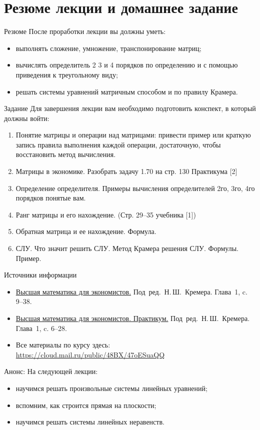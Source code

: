 \documentclass[unicode,11pt,notheorems]{beamer}
\begin{document}
\section{Резюме лекции и домашнее задание}
\begin{frame}{Резюме}
	После проработки лекции вы должны уметь:
	\begin{itemize}
	\item 
		выполнять сложение, умножение, транспонирование матриц;
	\item 
		вычислять определитель 2 3 и 4 порядков по определению и с помощью приведения к треугольному виду;
	\item 
		решать системы уравнений матричным способом и по правилу Крамера.
	\end{itemize}		
\end{frame}


\begin{frame}{Задание}
Для завершения лекции вам необходимо подготовить конспект, в который должны войти:
	\begin{enumerate}
		\item 
			Понятие матрицы и операции над матрицами: привести пример или краткую запись правила выполнения каждой операции, достаточную, чтобы восстановить метод вычисления.
		\item 
			Матрицы в экономике. Разобрать задачу 1.70 на стр. 130 Практикума [2]
		\item 
			Определение определителя. 
			Примеры вычисления определителей 2го, 3го, 4го порядков понятые вам. 
		\item 
			Ранг матрицы и его нахождение. (Стр. 29--35 учебника [1])
		\item 
			Обратная матрица и ее нахождение. Формула.
		\item 
			СЛУ. Что значит решить СЛУ. Метод Крамера решения СЛУ. Формулы. Пример.
	\end{enumerate}
\end{frame}
\begin{frame}{Источники информации}
\begin{itemize}
\item 
	{\color{blue}\href{https://cloud.mail.ru/public/jWCR/2BBwXTrkg}{Высшая математика для экономистов.}} Под~ред.~Н.\,Ш.~Кремера. Глава~1, c. 9--38.
\item 
	{\color{blue}\href{https://cloud.mail.ru/public/5c87/4Cmo8H9BA}{Высшая математика для экономистов. Практикум.}} Под~ред.~Н.\,Ш.~Кремера. Глава~1, c. 6--28.
	
\item 
	Все материалы по курсу здесь:
{\color{blue}\url{https://cloud.mail.ru/public/48BX/47oESuaQQ}}
\end{itemize}

\end{frame}

\begin{frame}{Анонс:}
	На следующей лекции:
	\begin{itemize}
	\item 
		научимся решать произвольные системы линейных уравнений;
	\item 
		вспомним, как строится прямая на плоскости;
	\item 
		научимся решать системы линейных неравенств.
	\end{itemize}

\end{frame}
\end{document}
